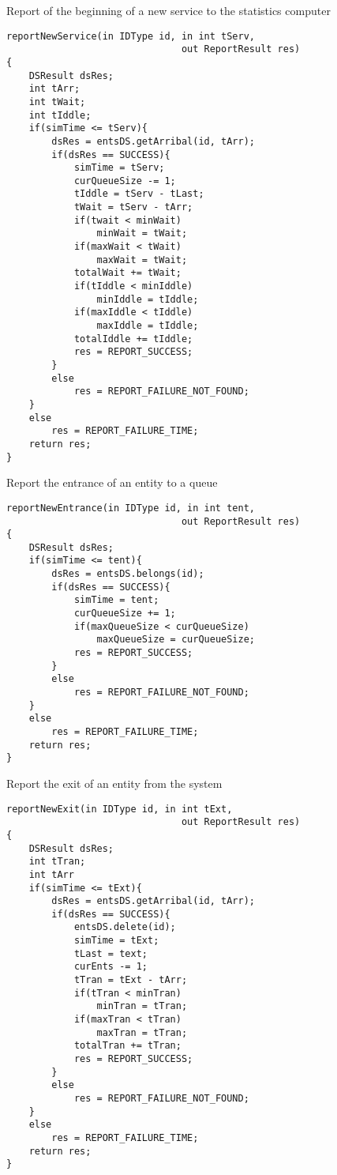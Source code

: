 \documentclass{article}
\begin{document}
\newpage

\begin{algorithm}[ht] 
\caption{Report of the beginning of a new service to the statistics computer}
\begin{Verbatim}[tabsize = 4]
reportNewService(in IDType id, in int tServ, 
							   out ReportResult res)
{
	DSResult dsRes;
	int tArr; 
	int tWait; 
	int tIddle; 
	if(simTime <= tServ){
		dsRes = entsDS.getArribal(id, tArr); 
		if(dsRes == SUCCESS){
			simTime = tServ; 
			curQueueSize -= 1;
			tIddle = tServ - tLast; 
			tWait = tServ - tArr; 
			if(twait < minWait)
				minWait = tWait;
			if(maxWait < tWait)
				maxWait = tWait;
			totalWait += tWait;  
			if(tIddle < minIddle)
				minIddle = tIddle;
			if(maxIddle < tIddle)
				maxIddle = tIddle; 
			totalIddle += tIddle; 
			res = REPORT_SUCCESS; 		
		}	
		else 
			res = REPORT_FAILURE_NOT_FOUND; 
	}
	else
		res = REPORT_FAILURE_TIME; 
	return res;
} 
\end{Verbatim} 
\label{alg:reportNewService}
\end{algorithm} 

\newpage 

\begin{algorithm}[ht] 
\caption{Report the entrance of an entity to a queue}
\begin{Verbatim}[tabsize = 4]
reportNewEntrance(in IDType id, in int tent, 
							   out ReportResult res)
{
	DSResult dsRes;
	if(simTime <= tent){
		dsRes = entsDS.belongs(id); 
		if(dsRes == SUCCESS){
			simTime = tent; 
			curQueueSize += 1;
			if(maxQueueSize < curQueueSize)
				maxQueueSize = curQueueSize; 
			res = REPORT_SUCCESS; 		
		}	
		else 
			res = REPORT_FAILURE_NOT_FOUND; 
	}
	else
		res = REPORT_FAILURE_TIME; 
	return res;
} 
\end{Verbatim} 
\label{alg:reportEntrance}
\end{algorithm} 

\newpage

\begin{algorithm}[ht] 
\caption{Report the exit of an entity from the system}
\begin{Verbatim}[tabsize = 4]
reportNewExit(in IDType id, in int tExt, 
							   out ReportResult res)
{
	DSResult dsRes;
	int tTran; 
	int tArr
	if(simTime <= tExt){
		dsRes = entsDS.getArribal(id, tArr); 
		if(dsRes == SUCCESS){
			entsDS.delete(id); 
			simTime = tExt; 
			tLast = text; 
			curEnts -= 1; 
			tTran = tExt - tArr;
			if(tTran < minTran)
				minTran = tTran;
			if(maxTran < tTran)
				maxTran = tTran; 
			totalTran += tTran; 
			res = REPORT_SUCCESS; 		
		}	
		else 
			res = REPORT_FAILURE_NOT_FOUND; 
	}
	else
		res = REPORT_FAILURE_TIME; 
	return res;
} 
\end{Verbatim} 
\label{alg:reportExit}
\end{algorithm} 
\end{document}
